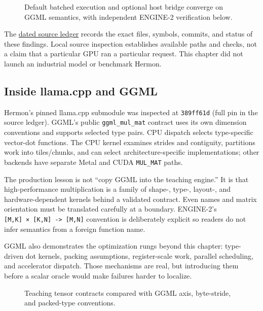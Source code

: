 \documentclass[
  10pt,
]{article}
\begin{document}
\begin{figure}[H]\centering\resizebox{\linewidth}{!}{}\caption{Default batched execution and optional host bridge converge on GGML semantics, with independent ENGINE-2 verification below.}\end{figure}

The
\href{https://github.com/hermonai/inside-the-llm-engine/blob/astra-visual-rewrite/research/astra/chapter06-regeneration.md}{dated
source ledger} records the exact files, symbols, commits, and status of
these findings. Local source inspection establishes available paths and
checks, not a claim that a particular GPU ran a particular request. This
chapter did not launch an industrial model or benchmark Hermon.

\subsection{Inside llama.cpp and GGML}\label{inside-llama.cpp-and-ggml}

Hermon's pinned llama.cpp submodule was inspected at \texttt{389ff61d}
(full pin in the source ledger). GGML's public \texttt{ggml\_mul\_mat}
contract uses its own dimension conventions and supports selected type
pairs. CPU dispatch selects type-specific vector-dot functions. The CPU
kernel examines strides and contiguity, partitions work into
tiles/chunks, and can select architecture-specific implementations;
other backends have separate Metal and CUDA \texttt{MUL\_MAT} paths.

The production lesson is not ``copy GGML into the teaching engine.'' It
is that high-performance multiplication is a family of shape-, type-,
layout-, and hardware-dependent kernels behind a validated contract.
Even names and matrix orientation must be translated carefully at a
boundary. ENGINE-2's
\texttt{{[}M,K{]}\ ×\ {[}K,N{]}\ -\textgreater{}\ {[}M,N{]}} convention
is deliberately explicit so readers do not infer semantics from a
foreign function name.

GGML also demonstrates the optimization rungs beyond this chapter:
type-driven dot kernels, packing assumptions, register-scale work,
parallel scheduling, and accelerator dispatch. Those mechanisms are
real, but introducing them before a scalar oracle would make failures
harder to localize.

\begin{figure}[H]\centering\resizebox{\linewidth}{!}{}\caption{Teaching tensor contracts compared with GGML axis, byte-stride, and packed-type conventions.}\end{figure}
\end{document}
